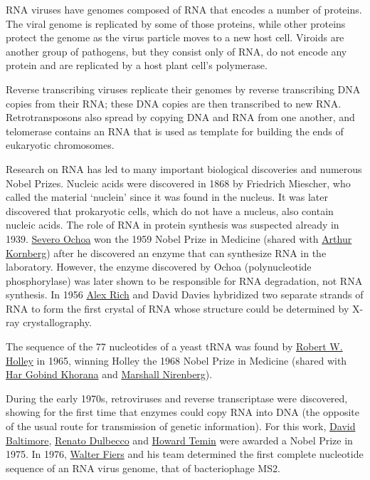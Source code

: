 RNA viruses have genomes composed of RNA that encodes a number of proteins. The viral genome is replicated by some of those proteins, while other proteins protect the genome as the virus particle moves to a new host cell. Viroids are another group of pathogens, but they consist only of RNA, do not encode any protein and are replicated by a host plant cell's polymerase.

Reverse transcribing viruses replicate their genomes by reverse transcribing DNA copies from their RNA; these DNA copies are then transcribed to new RNA. Retrotransposons also spread by copying DNA and RNA from one another, and telomerase contains an RNA that is used as template for building the ends of eukaryotic chromosomes.

Research on RNA has led to many important biological discoveries and numerous Nobel Prizes. Nucleic acids were discovered in 1868 by Friedrich Miescher, who called the material `nuclein' since it was found in the nucleus. It was later discovered that prokaryotic cells, which do not have a nucleus, also contain nucleic acids. The role of RNA in protein synthesis was suspected already in 1939. \href{}{Severo Ochoa} won the 1959 Nobel Prize in Medicine (shared with \href{}{Arthur Kornberg}) after he discovered an enzyme that can synthesize RNA in the laboratory. However, the enzyme discovered by Ochoa (polynucleotide phosphorylase) was later shown to be responsible for RNA degradation, not RNA synthesis. In 1956 \href{https://en.wikipedia.org/wiki/Alexander_Rich}{Alex Rich} and David Davies hybridized two separate strands of RNA to form the first crystal of RNA whose structure could be determined by X-ray crystallography.

The sequence of the 77 nucleotides of a yeast tRNA was found by \href{https://en.wikipedia.org/wiki/Robert_W._Holley}{Robert W. Holley} in 1965, winning Holley the 1968 Nobel Prize in Medicine (shared with \href{https://en.wikipedia.org/wiki/Har_Gobind_Khorana}{Har Gobind Khorana} and \href{https://en.wikipedia.org/wiki/Marshall_Warren_Nirenberg}{Marshall Nirenberg}).

During the early 1970s, retroviruses and reverse transcriptase were discovered, showing for the first time that enzymes could copy RNA into DNA (the opposite of the usual route for transmission of genetic information). For this work, \href{https://en.wikipedia.org/wiki/David_Baltimore}{David Baltimore}, \href{https://en.wikipedia.org/wiki/Renato_Dulbecco}{Renato Dulbecco} and \href{https://en.wikipedia.org/wiki/Howard_Martin_Temin}{Howard Temin} were awarded a Nobel Prize in 1975. In 1976, \href{}{Walter Fiers} and his team determined the first complete nucleotide sequence of an RNA virus genome, that of bacteriophage MS2.

